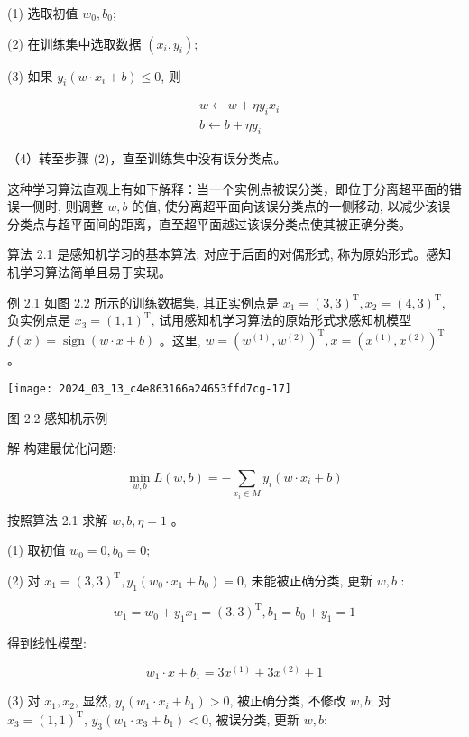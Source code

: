 \documentclass[10pt]{article}
\begin{document}
(1) 选取初值 $w_{0}, b_{0}$;

(2) 在训练集中选取数据 $\left(x_{i}, y_{i}\right)$;

(3) 如果 $y_{i}\left(w \cdot x_{i}+b\right) \leqslant 0$, 则

$$
\begin{aligned}
& w \leftarrow w+\eta y_{i} x_{i} \\
& b \leftarrow b+\eta y_{i}
\end{aligned}
$$

（4）转至步骤 (2)，直至训练集中没有误分类点。

这种学习算法直观上有如下解释：当一个实例点被误分类，即位于分离超平面的错误一侧时, 则调整 $w, b$ 的值, 使分离超平面向该误分类点的一侧移动, 以减少该误分类点与超平面间的距离，直至超平面越过该误分类点使其被正确分类。

算法 2.1 是感知机学习的基本算法, 对应于后面的对偶形式, 称为原始形式。感知机学习算法简单且易于实现。

例 2.1 如图 2.2 所示的训练数据集, 其正实例点是 $x_{1}=(3,3)^{\mathrm{T}}, x_{2}=(4,3)^{\mathrm{T}}$, 负实例点是 $x_{3}=(1,1)^{\mathrm{T}}$, 试用感知机学习算法的原始形式求感知机模型 $f(x)=\operatorname{sign}(w \cdot x+b)$ 。这里, $w=\left(w^{(1)}, w^{(2)}\right)^{\mathrm{T}}, x=\left(x^{(1)}, x^{(2)}\right)^{\mathrm{T}}$ 。

\begin{center}
\texttt{[image: 2024\_03\_13\_c4e863166a24653ffd7cg-17]}
\end{center}

图 2.2 感知机示例

解 构建最优化问题:

$$
\min _{w, b} L(w, b)=-\sum_{x_{i} \in M} y_{i}\left(w \cdot x_{i}+b\right)
$$

按照算法 2.1 求解 $w, b, \eta=1$ 。

(1) 取初值 $w_{0}=0, b_{0}=0$;

(2) 对 $x_{1}=(3,3)^{\mathrm{T}}, y_{1}\left(w_{0} \cdot x_{1}+b_{0}\right)=0$, 未能被正确分类, 更新 $w, b$ :

$$
w_{1}=w_{0}+y_{1} x_{1}=(3,3)^{\mathrm{T}}, b_{1}=b_{0}+y_{1}=1
$$

得到线性模型:

$$
w_{1} \cdot x+b_{1}=3 x^{(1)}+3 x^{(2)}+1
$$

(3) 对 $x_{1}, x_{2}$, 显然, $y_{i}\left(w_{1} \cdot x_{i}+b_{1}\right)>0$, 被正确分类, 不修改 $w, b$; 对 $x_{3}=(1,1)^{\mathrm{T}}$, $y_{3}\left(w_{1} \cdot x_{3}+b_{1}\right)<0$, 被误分类, 更新 $w, b:$
\end{document}
